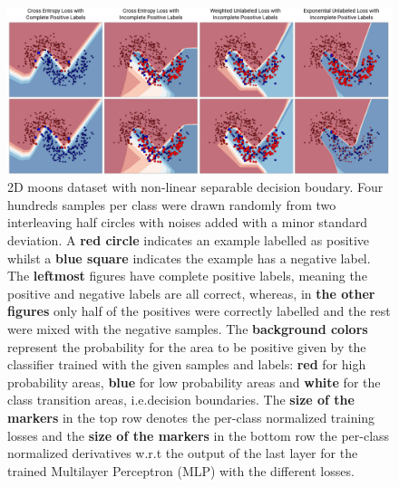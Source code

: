 \begin{figure}
\begin{center}
   \includegraphics[width=0.95\linewidth]{img/moons.png}
\end{center}
   \caption{2D moons dataset with non-linear separable decision boudary. Four hundreds samples per class were drawn randomly from two interleaving half circles with noises added with a minor standard deviation. A \textbf{red circle} indicates an example labelled as positive whilst a \textbf{blue square} indicates the example has a negative label. The \textbf{leftmost} figures have complete positive labels, meaning the positive and negative labels are all correct, whereas, in \textbf{the other figures} only half of the positives were correctly labelled and the rest were mixed with the negative samples. The \textbf{background colors} represent the probability for the area to be positive given by the classifier trained with the given samples and labels: \textbf{red} for high probability areas, \textbf{blue} for low probability areas and \textbf{white} for the class transition areas, i.e.decision boundaries. The \textbf{size of the markers} in the top row denotes the per-class normalized training losses and the \textbf{size of the markers} in the bottom row the per-class normalized derivatives w.r.t the output of the last layer for the trained Multilayer Perceptron (MLP) with the different losses.}
\label{fig:moons}
\end{figure}
